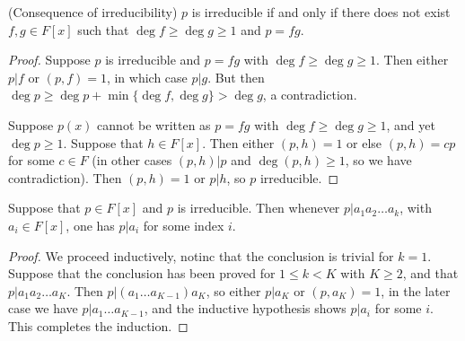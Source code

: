 
\begin{proposition}
	(Consequence of irreducibility)
	$p$ is irreducible if and only if there does not exist $f, g \in F[x]$ such that $\operatorname{deg}  f \ge \operatorname{deg} g \ge 1$ and $p = f g$.
\end{proposition}
\begin{proof}
	Suppose $p$ is irreducible and $p = fg$ with $\operatorname{deg}  f \ge  \operatorname{deg} g \ge 1$. Then either $p | f$ or $(p, f) = 1$, in which case $p | g$. But then $\operatorname{deg} p \ge  \operatorname{deg} p + \min \{\operatorname{deg} f, \operatorname{deg} g\} > \operatorname{deg} g$, a contradiction.

	Suppose $p(x)$ cannot be written as $p = fg $ with $\operatorname{deg} f \ge \operatorname{deg} g \ge 1$, and yet $\operatorname{deg}  p \ge  1$. Suppose that $h \in F[x]$. Then either $(p, h) = 1$ or else $(p, h) = c p $ for some $c \in F$ (in other cases $(p,h) | p$ and $\operatorname{deg} (p,h) \ge 1$, so we have contradiction). Then $(p, h) = 1$ or $p | h$, so $p$ irreducible.
\end{proof}

\begin{lemma}
	Suppose that $p \in F[x]$ and $p$ is irreducible. Then whenever $p | a_1a_2\ldots a_k$, with $a_i \in F[x]$, one has $p | a_i $ for some index $i$.
\end{lemma}
\begin{proof}
	We proceed inductively, notinc that the conclusion is trivial for $k = 1$. Suppose that the conclusion has been proved for $1 \le  k < K$ with $K \ge 2$, and that $p | a_1a_2\ldots a_K$. Then $p | (a_1\ldots a_{K-1} )a_K$, so either $p | a_K$ or $(p, a_K) = 1$, in the later case we have $p | a_1\ldots a_{K-1 }$, and the inductive hypothesis shows $p | a_i$ for some $i$. This completes the induction.
\end{proof}

